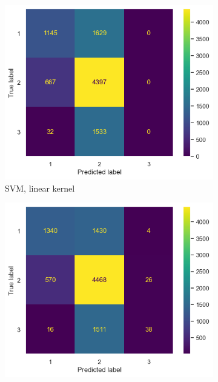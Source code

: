 \documentclass{article}
\begin{document}
\begin{figure}[!htpb]
\begin{subfigure}{0.49\textwidth}
    \includegraphics[width=\textwidth]{svmli.png}
    \caption{SVM, linear kernel}
\end{subfigure}
\begin{subfigure}{0.49\textwidth}
    \includegraphics[width=\textwidth]{svmrbf.png}

\end{subfigure}
\end{figure}
\end{document}
